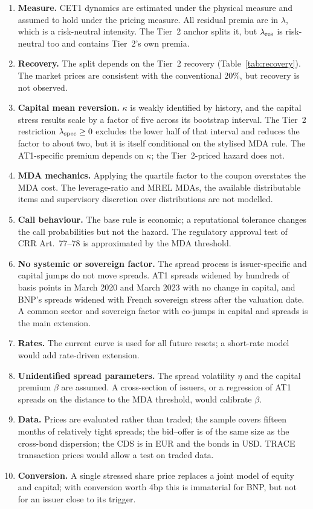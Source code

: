 \begin{enumerate}
  \item \textbf{Measure.} CET1 dynamics are estimated under the physical measure and assumed
  to hold under the pricing measure. All residual premia are in $\lambda$, which is a
  risk-neutral intensity. The Tier~2 anchor splits it, but $\lambda_{\mathrm{res}}$ is risk-neutral too and
  contains Tier~2's own premia.
  \item \textbf{Recovery.} The split depends on the Tier~2 recovery (Table~\ref{tab:recovery}).
  The market prices are consistent with the conventional $20\%$, but recovery is not observed.
  \item \textbf{Capital mean reversion.} $\kappa$ is weakly identified by history, and the
  capital stress results scale by a factor of five across its bootstrap interval. The
  Tier~2 restriction $\lambda_{\mathrm{spec}}\ge0$ excludes the lower half of that interval and reduces the
  factor to about two, but it is itself conditional on the stylised MDA rule. The
  AT1-specific premium depends on $\kappa$; the Tier~2-priced hazard does not.
  \item \textbf{MDA mechanics.} Applying the quartile factor to the coupon overstates the MDA
  cost. The leverage-ratio and MREL MDAs, the available distributable items and supervisory
  discretion over distributions are not modelled.
  \item \textbf{Call behaviour.} The base rule is economic; a reputational tolerance changes
  the call probabilities but not the hazard. The regulatory approval test of CRR
  Art.~77--78 is approximated by the MDA threshold.
  \item \textbf{No systemic or sovereign factor.} The spread process is issuer-specific and
  capital jumps do not move spreads. AT1 spreads widened by hundreds of basis points in March
  2020 and March 2023 with no change in capital, and BNP's spreads widened with French
  sovereign stress after the valuation date. A common sector and sovereign factor with
  co-jumps in capital and spreads is the main extension.
  \item \textbf{Rates.} The current curve is used for all future resets; a short-rate model
  would add rate-driven extension.
  \item \textbf{Unidentified spread parameters.} The spread volatility $\eta$ and the capital
  premium $\beta$ are assumed. A cross-section of issuers, or a regression of AT1 spreads on the
  distance to the MDA threshold, would calibrate $\beta$.
  \item \textbf{Data.} Prices are evaluated rather than traded; the sample covers fifteen
  months of relatively tight spreads; the bid--offer is of the same size as the cross-bond
  dispersion; the CDS is in EUR and the bonds in USD. TRACE transaction prices would allow a
  test on traded data.
  \item \textbf{Conversion.} A single stressed share price replaces a joint model of equity and
  capital; with conversion worth $4$bp this is immaterial for BNP, but not for an issuer close
  to its trigger.
\end{enumerate}

